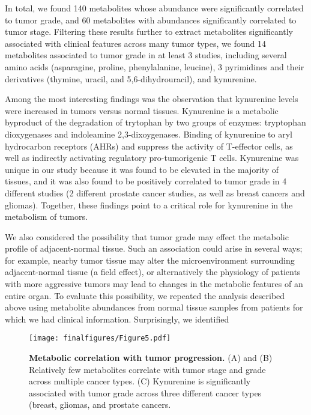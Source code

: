 \documentclass[10pt]{article}
\begin{document}
In total, we found 140 metabolites whose abundance were significantly correlated to tumor grade, and 60 metabolites with abundances significantly correlated to tumor stage. Filtering these results further to extract metabolites significantly associated with clinical features across many tumor types, we found 14 metabolites associated to tumor grade in at least 3 studies, including several amino acids (asparagine, proline, phenylalanine, leucine), 3 pyrimidines and their derivatives (thymine, uracil, and 5,6-dihydrouracil), and kynurenine. 

Among the most interesting findings was the observation that kynurenine levels were increased in tumors versus normal tissues. Kynurenine is a metabolic byproduct of the degradation of trytophan by two groups of enzymes: tryptophan dioxygenases and indoleamine 2,3-dixoygenases. Binding of kynurenine to aryl hydrocarbon receptors (AHRs) and suppress the activity of T-effector cells, as well as indirectly activating regulatory pro-tumorigenic T cells. Kynurenine was unique in our study because it was found to be elevated in the majority of tissues, and it was also found to be positively correlated to tumor grade in 4 different studies (2 different prostate cancer studies, as well as breast cancers and gliomas). Together, these findings point to a critical role for kynurenine in the metabolism of tumors.

We also considered the possibility that tumor grade may effect the metabolic profile of adjacent-normal tissue. Such an association could arise in several ways; for example, nearby tumor tissue may alter the microenvironment surrounding adjacent-normal tissue (a field effect), or alternatively the physiology of patients with more aggressive tumors may lead to changes in the metabolic features of an entire organ. To evaluate this possibility, we repeated the analysis described above using metabolite abundances from normal tissue samples from patients for which we had clinical information. Surprisingly, we identified 

\begin{figure}[ht!]
  \centering
     \texttt{[image: finalfigures/Figure5.pdf]}
  \caption{\textbf{Metabolic correlation with tumor progression.} (A) and (B) Relatively few metabolites correlate with tumor stage and grade across multiple cancer types. (C) Kynurenine is significantly associated with tumor grade across three different cancer types (breast, gliomas, and  prostate cancers.}
     \label{fig:Fig5}
\end{figure}
\end{document}
